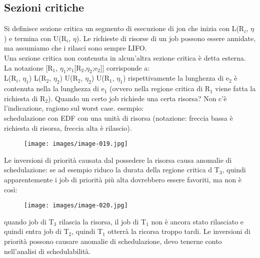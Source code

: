 \documentclass[12pt, oneside]{extbook}
\begin{document}
\subsection{Sezioni critiche}
Si definisce sezione critica un segmento di esecuzione di jon che inizia con L(R$_{i}$, $\eta$) e termina con U(R$_{i}$, $\eta$). Le richieste di risorse di un job possono essere annidate, ma assumiamo che i rilasci sono sempre LIFO.\\ Una sezione critica non contenuta in alcun'altra sezione critica è detta esterna.\\ La notazione [R$_{1}$, $\eta_1$;e$_{1}$[R$_{2}$,$\eta_2$;e$_{2}$]] corrisponde a:\\ L(R$_{i}$, $\eta_1$) L(R$_{2}$, $\eta_2$) U(R$_{2}$, $\eta_2$) U(R$_{1}$, $\eta_1$) rispettivamente la lunghezza di e$_{2}$ è contenuta nella la lunghezza di e$_{1}$ (ovvero nella regione critica di R$_{1}$ viene fatta la richiesta di R$_{2}$). Quando un certo job richiede una certa risorsa? Non c'è l'indicazione, ragiono sul worst case. esempio:\\
schedulazione con EDF con una unità di risorsa (notazione: freccia bassa è richiesta di risorsa, freccia alta è rilascio).\\
\begin{figure}[!h]
\centering
\texttt{[image: images/image-019.jpg]}
\end{figure}
Le inversioni di priorità causata dal possedere la risorsa causa anomalie di schedulazione: se ad esempio riduco la durata della regione critica d T$_{3}$, quindi apparentemente i job di priorità più alta dovrebbero essere favoriti, ma non è così:\\ 
\begin{figure}[!h]
\centering
\texttt{[image: images/image-020.jpg]}
\end{figure}
quando job di T$_{3}$ rilascia la risorsa, il job di T$_{1}$ non è ancora stato rilasciato e quindi entra job di T$_{2}$, quindi T$_{1}$ otterrà la ricorsa troppo tardi. Le inversioni di priorità possono causare anomalie di schedulazione, devo tenerne conto nell'analisi di schedulabilità.
\end{document}
